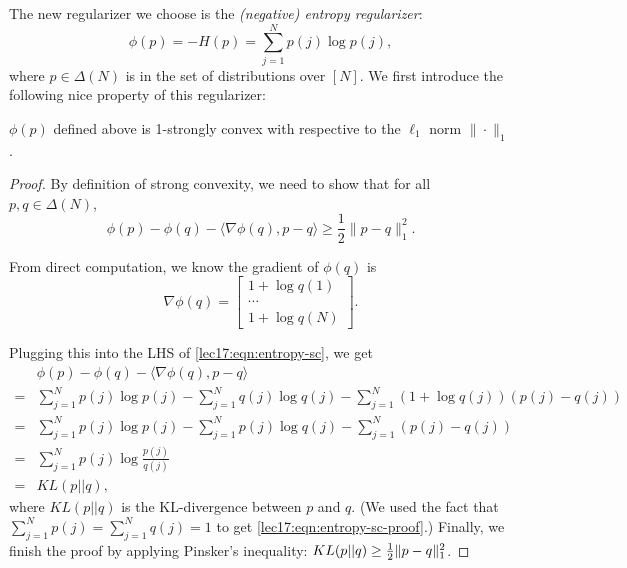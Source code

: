 The new regularizer we choose is the \textit{(negative) entropy regularizer}:
\begin{equation}
\phi(p) = -H(p) = \sum_{j=1}^N p(j)\log p(j),
\end{equation}
where $p \in \Delta(N)$ is in the set of distributions over $[N]$. We first introduce the following nice property of this regularizer:
\begin{lemma}
	$\phi(p)$ defined above is 1-strongly convex with respective to the $\ell_1$ norm $\|\cdot\|_1$. 
\end{lemma}

\begin{proof}
By definition of strong convexity, we need to show that for all $p, q \in \Delta(N)$,
\begin{equation}\label{lec17:eqn:entropy-sc}
\phi(p) - \phi(q) - \langle \nabla \phi(q), p-q\rangle \geq \frac{1}{2} \|p-q\|_1^2.
\end{equation}
	
From direct computation, we know the gradient of $\phi(q)$ is 
\begin{equation}
\nabla\phi(q) = \begin{bmatrix} 1+\log q(1)\\\cdots \\ 1+\log q(N) \end{bmatrix}.
\end{equation}
	
Plugging this into the LHS of \eqref{lec17:eqn:entropy-sc}, we get
\begin{align}
&\phi(p) - \phi(q) - \langle \nabla \phi(q), p-q\rangle  \\
=& \sum_{j=1}^N p(j)\log p(j) - \sum_{j=1}^N q(j)\log q(j) - \sum_{j=1}^N \left(1 + \log q(j)\right)\left(p(j) - q(j)\right) \\
=& \sum_{j=1}^N p(j)\log p(j) - \sum_{j=1}^N p(j)\log q(j) - \sum_{j=1}^N \left(p(j) - q(j)\right)\\
=& \sum_{j=1}^N p(j) \log \frac{p(j)}{q(j)} \label{lec17:eqn:entropy-sc-proof} \\
=& KL(p||q),
\end{align}
where $KL(p || q)$ is the KL-divergence between $p$ and $q$. (We used the fact that $\sum_{j=1}^N p(j) = \sum_{j=1}^N q(j) = 1$ to get \eqref{lec17:eqn:entropy-sc-proof}.) Finally, we finish the proof by applying Pinsker's inequality: $KL(p||q) \geq \frac{1}{2} \|p-q\|_1^2$. 
	
\end{proof}

